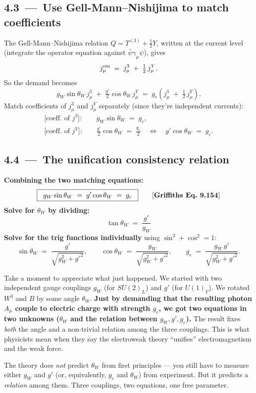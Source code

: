 \documentclass[11pt]{article}
\begin{document}
\subsection*{4.3 \,---\, Use Gell-Mann--Nishijima to match coefficients}

\begin{stepbox}[title=Step 4.3: Decompose $j^{\rm em}$ in terms of $j^3$ and $j^Y$]
The Gell-Mann--Nishijima relation $Q = T^{(3)} + \tfrac{1}{2} Y$, written at the current level
(integrate the operator equation against $\bar\psi \gamma_\mu \psi$), gives
\[
j^{\rm em}_\mu \;=\; j^3_\mu \;+\; \tfrac{1}{2}\, j^Y_\mu .
\]
So the demand becomes
\[
g_W \sin\theta_W \, j^3_\mu \;+\; \tfrac{g'}{2} \cos\theta_W \, j^Y_\mu
\;=\; g_e\!\left( j^3_\mu \;+\; \tfrac{1}{2}\, j^Y_\mu \right) .
\]
Match coefficients of $j^3_\mu$ and $j^Y_\mu$ separately (since they're independent currents):
\begin{align}
\text{[coeff. of }j^3\text{]:}\quad &\; g_W \sin\theta_W \;=\; g_e , \\[2pt]
\text{[coeff. of }j^Y\text{]:}\quad &\; \tfrac{g'}{2} \cos\theta_W \;=\; \tfrac{g_e}{2}
\quad\Longleftrightarrow\quad g' \cos\theta_W \;=\; g_e .
\end{align}
\end{stepbox}

\subsection*{4.4 \,---\, The unification consistency relation}

\begin{resultbox}
\textbf{Combining the two matching equations:}
\[
\boxed{\;\;
g_W \sin\theta_W \;=\; g' \cos\theta_W \;=\; g_e
\;\;}
\qquad\text{[\textbf{Griffiths Eq.~9.154}]}
\]
\textbf{Solve for $\theta_W$ by dividing:}
\[
\boxed{\;\;
\tan\theta_W \;=\; \frac{g'}{g_W}
\;\;}
\]
\textbf{Solve for the trig functions individually} using $\sin^2 + \cos^2 = 1$:
\[
\sin\theta_W \;=\; \frac{g'}{\sqrt{g_W^2 + g'^2}},
\qquad
\cos\theta_W \;=\; \frac{g_W}{\sqrt{g_W^2 + g'^2}},
\qquad
g_e \;=\; \frac{g_W \, g'}{\sqrt{g_W^2 + g'^2}}.
\]
\end{resultbox}

\begin{insightbox}
Take a moment to appreciate what just happened. We started with two independent gauge
couplings $g_W$ (for $SU(2)_L$) and $g'$ (for $U(1)_Y$). We rotated $W^3$ and $B$ by some
angle $\theta_W$. \textbf{Just by demanding that the resulting photon $A_\mu$ couple to
electric charge with strength $g_e$, we got two equations in two unknowns ($\theta_W$ and
the relation between $g_W, g', g_e$).} The result fixes \emph{both} the angle and a
non-trivial relation among the three couplings. This is what physicists mean when they
say the electroweak theory ``unifies'' electromagnetism and the weak force.

The theory does \emph{not} predict $\theta_W$ from first principles --- you still have to
measure either $g_W$ and $g'$ (or, equivalently, $g_e$ and $\theta_W$) from experiment. But
it predicts a \emph{relation} among them. Three couplings, two equations, one free parameter.
\end{insightbox}
\end{document}
